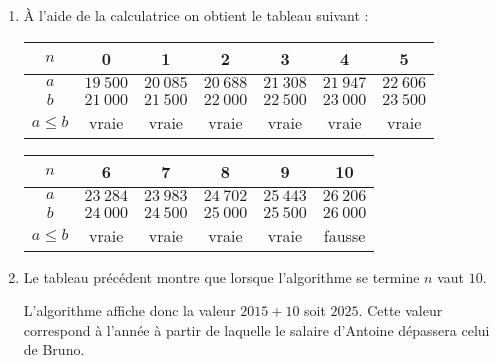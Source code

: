 \begin{corrige}
     \begin{enumerate}
          \item \`A l'aide de la calculatrice on obtient le tableau suivant :
          \par
          \begin{tabular}{|c|c|c|c|c|c|c|}\hline  %
               $n$	& 0	&	1 &	2 &	3 &	4 &	5  \\ \hline
               $a$	& $19\ 500$	& $20\ 085$  	& $20\ 688$  	&$21\ 308$  	& $21\ 947$  	& $22\ 606$   \\ \hline
               $b$	& $21\ 000$	& $21\ 500$  	& $22\ 000$  	& $22\ 500$  	& $23\ 000$  	& $23\ 500$ 	\\ \hline
               $a \leqslant  b$	& vraie	& 	vraie	& vraie	& vraie	& vraie	& vraie	 \\ \hline
          \end{tabular}
          \par
          \begin{tabular}{|c|c|c|c|c|c|}\hline %
               $n$	& 6 &	7 &	8 &	9 &	10 \\ \hline
               $a$	& $23\ 284$  	& $23\ 983$  	& $24\ 702$  	& $25\ 443$  	& $26\ 206$  	\\ \hline
               $b$	& $24\ 000$  	& $24\ 500$  	& $25\ 000$  	& $25\ 500$  	& $26\ 000$  	\\ \hline
               $a \leqslant  b$	& vraie	& vraie	& vraie	& vraie	& fausse	  \\ \hline
          \end{tabular}
          \par
          \par
          \item Le tableau précédent montre que lorsque l'algorithme se termine $n$ vaut $10$.
          \par
          L'algorithme affiche donc la valeur ${2015+10}$ soit $2025$. Cette valeur correspond à l'année à partir de laquelle le salaire d'Antoine dépassera celui de Bruno.
     \end{enumerate}
\end{corrige}

